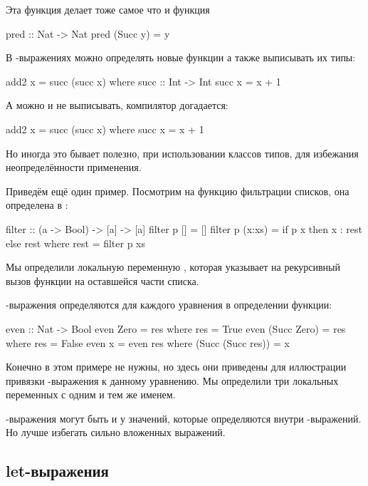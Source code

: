 Эта функция делает тоже самое что и функция

\begin{code}
pred :: Nat -> Nat
pred (Succ y) = y
\end{code}

В -выражениях можно определять новые функции
а также выписывать их типы:

\begin{code}
add2 x = succ (succ x)
    where succ :: Int -> Int
          succ x = x + 1
\end{code}

А можно и не выписывать, компилятор догадается:

\begin{code}
add2 x = succ (succ x)
    where succ x = x + 1
\end{code}

Но иногда это бывает полезно, при использовании классов
типов, для избежания неопределённости применения.

Приведём ещё один пример. Посмотрим на функцию
фильтрации списков, она определена в :

\begin{code}
filter :: (a -> Bool) -> [a] -> [a]
filter  p  []     = []
filter  p  (x:xs) = if p x then x : rest else rest
    where rest = filter p xs
\end{code}

Мы определили локальную переменную , которая
указывает на рекурсивный вызов функции на оставшейся части
списка.

-выражения определяются для каждого уравнения
в определении функции: 

\begin{code}
even :: Nat -> Bool
even Zero        = res
    where res = True
even (Succ Zero) = res
    where res = False
even x = even res
    where (Succ (Succ res)) = x
\end{code}

Конечно в этом примере  не нужны, но здесь они приведены
для иллюстрации привязки -выражения к данному уравнению.
Мы определили три локальных переменных с одним и тем же именем.

-выражения могут быть и у значений, которые
определяются внутри -выражений. Но лучше избегать
сильно вложенных выражений.

\subsection{let-выражения}

